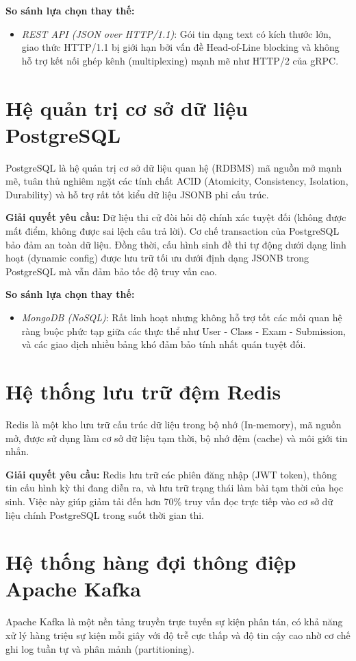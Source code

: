 \documentclass[../DoAn.tex]{subfiles}
\begin{document}
\textbf{So sánh lựa chọn thay thế:}
\begin{itemize}
    \item \textit{REST API (JSON over HTTP/1.1)}: Gói tin dạng text có kích thước lớn, giao thức HTTP/1.1 bị giới hạn bởi vấn đề Head-of-Line blocking và không hỗ trợ kết nối ghép kênh (multiplexing) mạnh mẽ như HTTP/2 của gRPC.
\end{itemize}

\section{Hệ quản trị cơ sở dữ liệu PostgreSQL}
\label{section:3.5}
PostgreSQL là hệ quản trị cơ sở dữ liệu quan hệ (RDBMS) mã nguồn mở mạnh mẽ, tuân thủ nghiêm ngặt các tính chất ACID (Atomicity, Consistency, Isolation, Durability) và hỗ trợ rất tốt kiểu dữ liệu JSONB phi cấu trúc.

\textbf{Giải quyết yêu cầu:} Dữ liệu thi cử đòi hỏi độ chính xác tuyệt đối (không được mất điểm, không được sai lệch câu trả lời). Cơ chế transaction của PostgreSQL bảo đảm an toàn dữ liệu. Đồng thời, cấu hình sinh đề thi tự động dưới dạng linh hoạt (dynamic config) được lưu trữ tối ưu dưới định dạng JSONB trong PostgreSQL mà vẫn đảm bảo tốc độ truy vấn cao.

\textbf{So sánh lựa chọn thay thế:}
\begin{itemize}
    \item \textit{MongoDB (NoSQL)}: Rất linh hoạt nhưng không hỗ trợ tốt các mối quan hệ ràng buộc phức tạp giữa các thực thể như User - Class - Exam - Submission, và các giao dịch nhiều bảng khó đảm bảo tính nhất quán tuyệt đối.
\end{itemize}

\section{Hệ thống lưu trữ đệm Redis}
\label{section:3.6}
Redis là một kho lưu trữ cấu trúc dữ liệu trong bộ nhớ (In-memory), mã nguồn mở, được sử dụng làm cơ sở dữ liệu tạm thời, bộ nhớ đệm (cache) và môi giới tin nhắn.

\textbf{Giải quyết yêu cầu:} Redis lưu trữ các phiên đăng nhập (JWT token), thông tin cấu hình kỳ thi đang diễn ra, và lưu trữ trạng thái làm bài tạm thời của học sinh. Việc này giúp giảm tải đến hơn 70\% truy vấn đọc trực tiếp vào cơ sở dữ liệu chính PostgreSQL trong suốt thời gian thi.

\section{Hệ thống hàng đợi thông điệp Apache Kafka}
\label{section:3.7}
Apache Kafka là một nền tảng truyền trực tuyến sự kiện phân tán, có khả năng xử lý hàng triệu sự kiện mỗi giây với độ trễ cực thấp và độ tin cậy cao nhờ cơ chế ghi log tuần tự và phân mảnh (partitioning).
\end{document}
